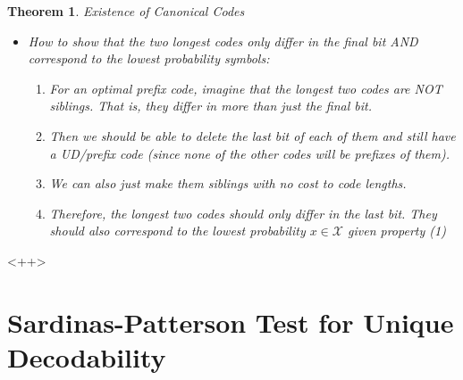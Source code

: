 \documentclass[a4paper,12pt]{report}
\newtheorem{theorem}{Theorem}
\begin{document}
\begin{theorem}{Existence of Canonical Codes}
\begin{itemize}
\item How to show that the two longest codes only differ in the final bit AND
correspond to the lowest probability symbols: 
	\begin{enumerate}
	\item For an optimal prefix code, imagine that the longest two codes are NOT
	siblings. That is, they differ in more than just the final bit. 
	\item Then we should be able to delete the last bit of each of them and
	still have a UD/prefix code (since none of the other codes will be prefixes
	of them). 
	\item We can also just make them siblings with no cost to code lengths.
	\item Therefore, the longest two codes should only differ in the last bit.
	They should also correspond to the lowest probability $x\in \mathcal X$
	given property (1) \qedsymbol{}
	\end{enumerate}



\end{itemize}



\end{theorem}
<++>








\section{Sardinas-Patterson Test for Unique Decodability}
\end{document}
